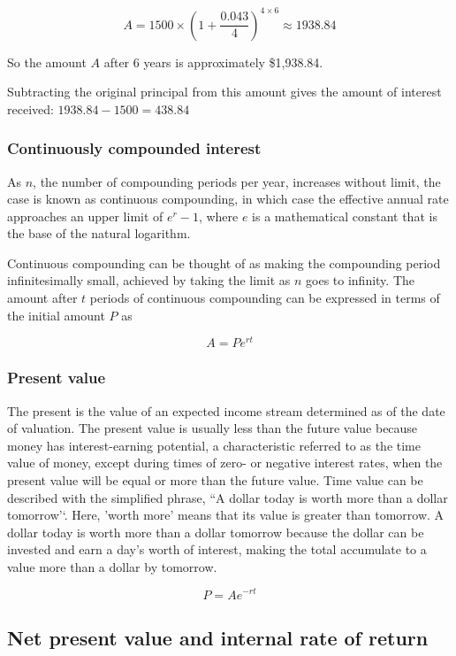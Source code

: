 \documentclass[
  12pt,
  oneside]{book}
\theoremstyle{definition}
\theoremstyle{definition}
\theoremstyle{definition}
\theoremstyle{definition}
\theoremstyle{remark}
\begin{document}
\[
A=1500\times\left(1+\frac{0.043}{4}\right)^{4\times 6}\approx 1938.84
\]

So the amount \(A\) after 6 years is approximately \$1,938.84.

Subtracting the original principal from this amount gives the amount of interest received: \(1938.84-1500=438.84\)

\hypertarget{continuously-compounded-interest}{%
\subsubsection{Continuously compounded interest}\label{continuously-compounded-interest}}

As \(n\), the number of compounding periods per year, increases without limit, the case is known as continuous compounding, in which case the effective annual rate approaches an upper limit of \(e^r- 1\), where \(e\) is a mathematical constant that is the base of the natural logarithm.

Continuous compounding can be thought of as making the compounding period infinitesimally small, achieved by taking the limit as \(n\) goes to infinity. The amount after \(t\) periods of continuous compounding can be expressed in terms of the initial amount \(P\) as

\[
A=Pe^{rt}
\]

\hypertarget{present-value}{%
\subsubsection{Present value}\label{present-value}}

The present is the value of an expected income stream determined as of the date of valuation. The present value is usually less than the future value because money has interest-earning potential, a characteristic referred to as the time value of money, except during times of zero- or negative interest rates, when the present value will be equal or more than the future value. Time value can be described with the simplified phrase, ``A dollar today is worth more than a dollar tomorrow'`. Here, 'worth more' means that its value is greater than tomorrow. A dollar today is worth more than a dollar tomorrow because the dollar can be invested and earn a day's worth of interest, making the total accumulate to a value more than a dollar by tomorrow.

\[
P=Ae^{-rt}
\]

\hypertarget{net-present-value-and-internal-rate-of-return}{%
\subsection{Net present value and internal rate of return}\label{net-present-value-and-internal-rate-of-return}}
\end{document}
